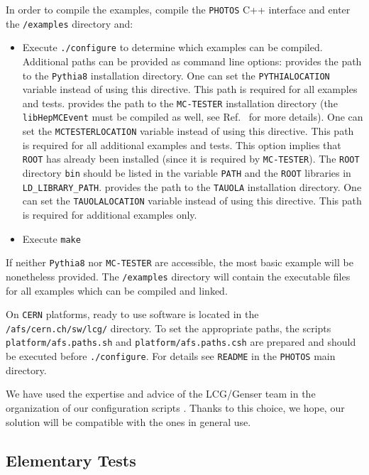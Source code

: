 \documentclass[]{Photos_interface_design}
\begin{document}
In order to compile the examples, compile the {\tt PHOTOS} C++ interface and enter the {\tt /examples} directory and:
\begin{itemize}
  \item Execute {\tt ./configure} to determine which examples can be compiled.
        Additional paths can be provided as command line options:
    provides the path to the {\tt Pythia8} installation
            directory. One can set the {\tt PYTHIALOCATION} variable instead of using this directive.
            This path is required for all examples and tests.
    provides the path to the {\tt MC-TESTER} installation
            directory (the {\tt libHepMCEvent} must be compiled as well, see Ref.~\cite{Davidson:2008ma}
			for more details). One can set the {\tt MCTESTERLOCATION} variable instead of using this
			directive. This path is required for all additional examples and tests.  This option
			implies that {\tt ROOT} has already been installed (since it is required by {\tt MC-TESTER}).
			The {\tt ROOT} directory {\tt bin} should be listed in the variable {\tt PATH} and the {\tt ROOT}
			libraries in {\tt LD\_LIBRARY\_PATH}.
    provides the path to the {\tt TAUOLA} installation directory.
            One can set the {\tt TAUOLALOCATION} variable instead of using this directive.
			This path is required for additional examples only.
  \item Execute {\tt make}
\end{itemize}

If neither {\tt Pythia8} nor {\tt MC-TESTER} are accessible,  the most basic
 example will be nonetheless provided. The {\tt /examples} directory will 
contain the executable files for all examples which can be compiled and 
linked.

On {\tt CERN} platforms, ready to use software is located in the {\tt /afs/cern.ch/sw/lcg/}
directory. To set the appropriate paths, the scripts 
{\tt platform/afs.paths.sh} and {\tt platform/afs.paths.csh} are prepared and should be executed before
{\tt ./configure}. For details see {\tt README} in the {\tt PHOTOS} main directory.

We have used the expertise and advice 
of the LCG/Genser team  in the organization of our configuration scripts 
 \cite{Kirsanov:2008zz}.  Thanks to this choice, we hope, our solution
 will be compatible with the ones in general use.

\subsection{Elementary Tests}
\label{sect:elem}
\end{document}
